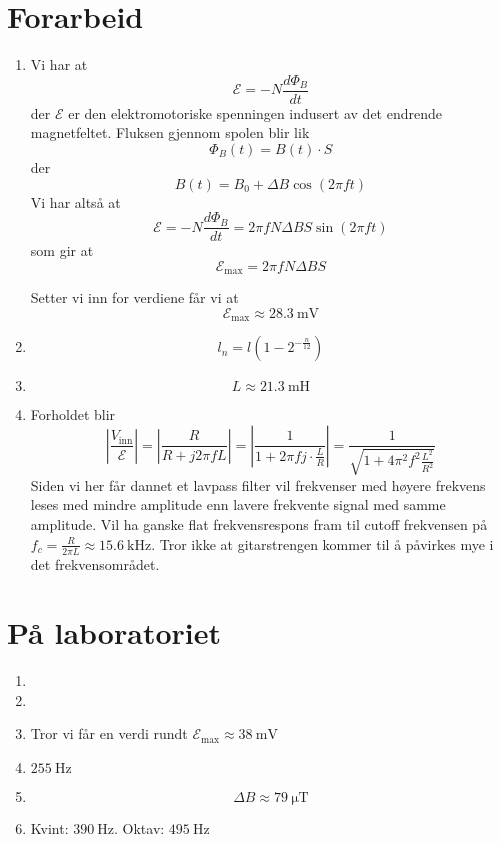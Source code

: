 \documentclass[a4paper,11pt,norsk]{article}
\begin{document}


\section*{Forarbeid}
\begin{enumerate}
    \item Vi har at
        \[
            \mathcal{E} = -N\frac{d\Phi_{B}}{dt}
        \]
        der $\mathcal{E}$ er den elektromotoriske spenningen indusert av det endrende magnetfeltet.
        Fluksen gjennom spolen blir lik
        \[
            \Phi_{B}(t) = B(t) \cdot S
        \]
        der 
        \[
            B(t) = B_0 + \Delta B\cos(2\pi f t)
        \]
        Vi har altså at 
        \[
            \mathcal{E} = -N\frac{d\Phi_{B}}{dt} = 2\pi f N \Delta B S \sin(2\pi f t)
        \]
        som gir at 
        \[
            \mathcal{E}_{\text{max}} = 2\pi f N \Delta B S
        \]

        Setter vi inn for verdiene får vi at
        \[
            \mathcal{E}_{\text{max}} \approx \SI{28.3}{\milli\volt}
        \]

    \item 
        \[
            l_n = l(1 - 2^{-\frac{n}{12}})
        \]

    \item 
        \[
            L \approx \SI{21.3}{\milli\henry}
        \]

    \item Forholdet blir 
        \[
            \left|\frac{V_{\text{inn}}}{\mathcal{E}}\right| = \left|\frac{R}{R + j 2\pi f L}\right| = \left|\frac{1}{1 + 2\pi fj \cdot \frac{L}{R}}\right| = \frac{1}{\sqrt{1 + 4\pi^2 f^2 \frac{L^2}{R^2}}}
        \]
        Siden vi her får dannet et lavpass filter vil frekvenser med høyere frekvens leses med mindre amplitude enn lavere frekvente signal med samme
        amplitude. Vil ha ganske flat frekvensrespons fram til cutoff frekvensen på $f_c = \frac{R}{2\pi L} \approx \SI{15.6}{\kilo\hertz}$.
        Tror ikke at gitarstrengen kommer til å påvirkes mye i det frekvensområdet.

\end{enumerate}

\section*{På laboratoriet}
\begin{enumerate}
    \item 
    \item 
    \item Tror vi får en verdi rundt $\mathcal{E}_{\text{max}} \approx \SI{38}{\milli\volt}$
    \item $\SI{255}{\hertz}$
    \item 
        \[
            \Delta B \approx \SI{79}{\micro\tesla}
        \]
    \item Kvint: $\SI{390}{\hertz}$. Oktav: $\SI{495}{\hertz}$
\end{enumerate}
\end{document}
